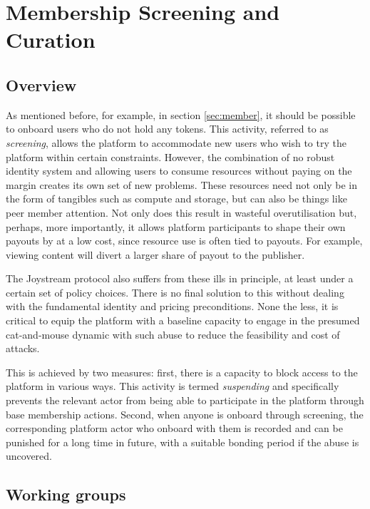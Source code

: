 \documentclass{article}
\begin{document}
\section{Membership Screening and Curation} \label{sec:membership_curation}

\subsection{Overview}

As mentioned before, for example, in section \ref{sec:member}, it should be possible to onboard users who do not hold any tokens. This activity, referred to as  \textit{screening}, allows the platform to accommodate new users who wish to try the platform within certain constraints. However, the combination of no robust identity system and allowing users to consume resources without paying on the margin creates its own set of new problems. These resources need not only be in the form of tangibles such as compute and storage, but can also be things like peer member attention. Not only does this result in wasteful overutilisation but, perhaps, more importantly, it allows platform participants to shape their own payouts by at a low cost, since resource use is often tied to payouts. For example, viewing content will divert a larger share of payout to the publisher.

The Joystream protocol also suffers from these ills in principle, at least under a certain set of policy choices. There is no final solution to this without dealing with the fundamental identity and pricing preconditions. None the less, it is critical to equip the platform with a baseline capacity to engage in the presumed cat-and-mouse dynamic with such abuse to reduce the feasibility and cost of attacks.

This is achieved by two measures: first, there is a capacity to block access to the platform in various ways. This activity is termed \textit{suspending} and specifically prevents the relevant actor from being able to participate in the platform through base membership actions.
Second, when anyone is onboard through screening, the corresponding platform actor who onboard with them is recorded and can be punished for a long time in  future, with a suitable bonding period if the abuse is uncovered.

\subsection{Working groups}
\end{document}
